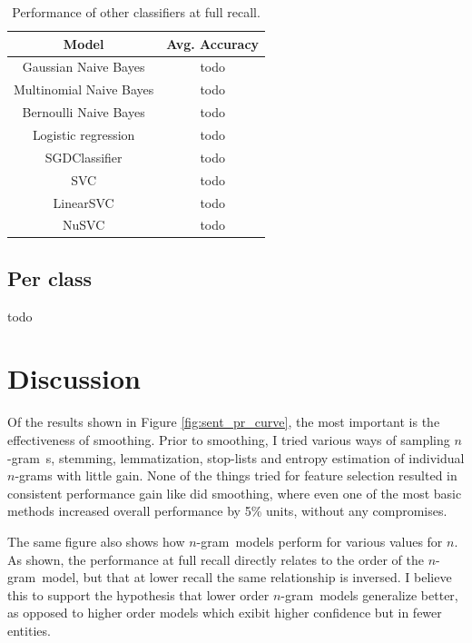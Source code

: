\documentclass[a4paper,11pt]{kth-mag}
\newcommand{\ngram}{$n$-gram}
\newcommand{\ysc}{Modified Kneser-Ney classifier}
\begin{document}
\begin{table}[t]
  \centering
  \begin{tabular}{| c | c |}
    \hline
    \textbf{Model} & \textbf{Avg. Accuracy}\\ \hline
    Gaussian Naive Bayes & todo\\
    Multinomial Naive Bayes & todo \\
    Bernoulli Naive Bayes & todo \\
    Logistic regression & todo \\
    SGDClassifier & todo \\
    SVC & todo \\
    LinearSVC  & todo \\
    NuSVC & todo \\
    \hline
  \end{tabular}
  \caption{Performance of other classifiers at full recall.}
  \label{tab:found_ngrams}
\end{table}

\subsection{Per class}
todo


\newpage
\section{Discussion}
Of the results shown in Figure \ref{fig:sent_pr_curve}, the most important 
is the effectiveness of smoothing.
Prior to smoothing, I tried various ways of sampling \ngram~s, stemming, lemmatization, stop-lists and entropy estimation of individual \ngram s with little gain. None of the things tried for feature selection resulted in consistent performance gain like did smoothing, where even one of the most basic methods increased overall performance by 5\% units, without any compromises.

The same figure also shows how \ngram~models perform for various values for $n$.
As shown, the performance at full recall directly relates to the order of the
\ngram~model, but that at lower recall the same relationship is inversed. I believe this
to support the hypothesis that lower order \ngram~models generalize better, as opposed to higher order
models which exibit higher confidence but in fewer entities.


\end{document}
